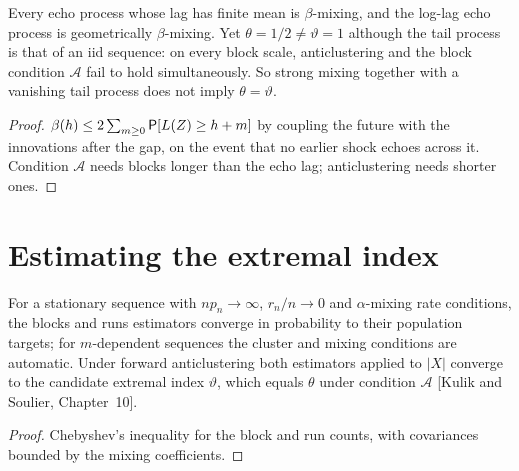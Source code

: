 \begin{theorem}[Mixing does not give $\theta = \vartheta$]
  \label{thm:echo-beta-mixing}
  \leanok
  Every echo process whose lag has finite mean is $\beta$-mixing, and the log-lag echo process is geometrically
  $\beta$-mixing. Yet $\theta = 1/2 \ne \vartheta = 1$ although the tail process is that of an iid sequence: on every block scale,
  anticlustering and the block condition $\mathcal A$ fail to hold simultaneously. So strong mixing together with a
  vanishing tail process does not imply $\theta = \vartheta$.
\end{theorem}
\begin{proof}
  \leanok
  $\beta(h) \le 2\sum_{m \ge 0} \mathsf{P}[L(Z) \ge h + m]$ by coupling the future with the innovations after the gap, on the event
  that no earlier shock echoes across it. Condition $\mathcal A$ needs blocks longer than the echo lag; anticlustering
  needs shorter ones.
\end{proof}

\section{Estimating the extremal index}

\begin{theorem}
  \label{thm:extremal-index-estimators}
  \leanok
  For a stationary sequence with $n p_n \to \infty$, $r_n/n \to 0$ and $\alpha$-mixing rate conditions, the blocks and runs
  estimators converge in probability to their population targets; for $m$-dependent sequences the cluster and mixing
  conditions are automatic. Under forward anticlustering both estimators applied to $|X|$ converge to the candidate
  extremal index $\vartheta$, which equals $\theta$ under condition $\mathcal A$ [Kulik and Soulier, Chapter~10].
\end{theorem}
\begin{proof}
  \leanok
  Chebyshev's inequality for the block and run counts, with covariances bounded by the mixing coefficients.
\end{proof}

